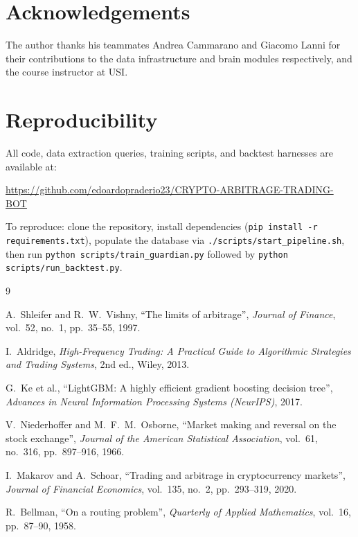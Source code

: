 \documentclass[11pt,a4paper]{article}
\begin{document}
\section*{Acknowledgements}
The author thanks his teammates Andrea Cammarano and Giacomo Lanni for their contributions to the data infrastructure and brain modules respectively, and the course instructor at USI.

\section*{Reproducibility}
All code, data extraction queries, training scripts, and backtest harnesses are available at:
\begin{center}
\url{https://github.com/edoardopraderio23/CRYPTO-ARBITRAGE-TRADING-BOT}
\end{center}
\noindent To reproduce: clone the repository, install dependencies (\texttt{pip install -r requirements.txt}), populate the database via \texttt{./scripts/start\_pipeline.sh}, then run \texttt{python scripts/train\_guardian.py} followed by \texttt{python scripts/run\_backtest.py}.

\begin{thebibliography}{9}

A.\ Shleifer and R.\ W.\ Vishny, ``The limits of arbitrage'',
\textit{Journal of Finance}, vol.~52, no.~1, pp.~35--55, 1997.

I.\ Aldridge,
\textit{High-Frequency Trading: A Practical Guide to Algorithmic Strategies and Trading Systems}, 2nd ed.,
Wiley, 2013.

G.\ Ke et al., ``LightGBM: A highly efficient gradient boosting decision tree'',
\textit{Advances in Neural Information Processing Systems (NeurIPS)}, 2017.

V.\ Niederhoffer and M.\ F.\ M.\ Osborne, ``Market making and reversal on the stock exchange'',
\textit{Journal of the American Statistical Association}, vol.~61, no.~316, pp.~897--916, 1966.

I.\ Makarov and A.\ Schoar, ``Trading and arbitrage in cryptocurrency markets'',
\textit{Journal of Financial Economics}, vol.~135, no.~2, pp.~293--319, 2020.

R.\ Bellman, ``On a routing problem'',
\textit{Quarterly of Applied Mathematics}, vol.~16, pp.~87--90, 1958.

\end{thebibliography}
\end{document}
